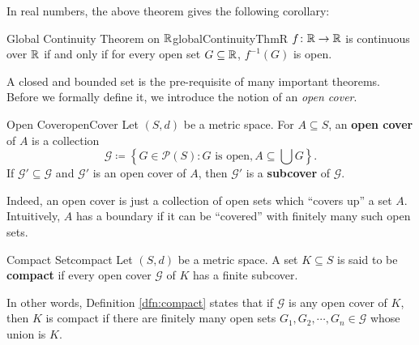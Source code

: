 \documentclass[math]{amznotes}
\theoremstyle{remark}
\begin{document}
In real numbers, the above theorem gives the following corollary:
\begin{corbox}{Global Continuity Theorem on $\mathbb{R}$}{globalContinuityThmR}
    $f \colon \mathbb{R} \to \mathbb{R}$ is continuous over $\mathbb{R}$ if and only if for every open set $G \subseteq \mathbb{R}$, $f^{-1}(G)$ is open.
\end{corbox}
A closed and bounded set is the pre-requisite of many important theorems. Before we formally define it, we introduce the notion of an \textit{open cover}.
\begin{dfnbox}{Open Cover}{openCover}
    Let $(S, d)$ be a metric space. For $A \subseteq S$, an {\color{red} \textbf{open cover}} of $A$ is a collection
    \begin{equation*}
        \mathcal{G} \coloneqq \left\{G \in \mathcal{P}(S) \colon G \textrm{ is open}, A \subseteq \bigcup G\right\}.
    \end{equation*}
    If $\mathcal{G}' \subseteq \mathcal{G}$ and $\mathcal{G}'$ is an open cover of $A$, then $\mathcal{G}'$ is a {\color{red} \textbf{subcover}} of $\mathcal{G}$.
\end{dfnbox}
Indeed, an open cover is just a collection of open sets which ``covers up'' a set $A$. Intuitively, $A$ has a boundary if it can be ``covered'' with finitely many such open sets.
\begin{dfnbox}{Compact Set}{compact}
   Let $(S, d)$ be a metric space. A set $K \subseteq S$ is said to be {\color{red} \textbf{compact}} if every open cover $\mathcal{G}$ of $K$ has a finite subcover. 
\end{dfnbox}
In other words, Definition \ref{dfn:compact} states that if $\mathcal{G}$ is any open cover of $K$, then $K$ is compact if there are finitely many open sets $G_1, G_2, \cdots, G_n \in \mathcal{G}$ whose union is $K$.
\end{document}
